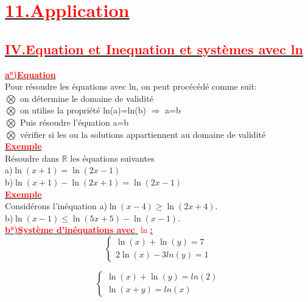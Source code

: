 \documentclass[12pt]{article}
\begin{document}
\section*{\underline{\textbf{\textcolor{red}{11.Application}}}}
\subsection*{\underline{\textbf{\textcolor{red}{IV.Equation et Inequation et systèmes avec ln}}}}
\underline{\textbf{\textcolor{red}{a°)Equation}}}\\
Pour résoudre les équations avec ln, on peut procécédé comme suit:\\
$\bigotimes$ on détermine le domaine de validité\\
$\bigotimes$ on utilise la propriété ln(a)=ln(b) $\Longrightarrow$ a=b \\
$\bigotimes$ Puis résoudre l'équation a=b\\
$\bigotimes$ vérifier si les ou la solutions appartiennent au domaine de validité\\
\underline{\textbf{\textcolor{red}{Exemple}}}\\
Résoudre dans $\mathbb{R}$ les équations suivantes\\
a)$\ln(x+1)=\ln(2x-1)$\\
b)$\ln(x+1)-\ln(2x+1)=\ln(2x-1)$\\
\underline{\textbf{\textcolor{red}{Exemple}}}\\
Considérons l'inéquation 
a)$\ln(x-4)\geq \ln(2x+4).$\\
b)$\ln(x-1)\leq \ln(5x+5)-\ln(x-1).$\\
\underline{\textbf{\textcolor{red}{b°)Système d'inéquations avec $\ln$:}}}\\
\[
\begin{cases}
\ln(x)+\ln(y) = 7 \\
2\ln(x)-3ln(y) = 1
\end{cases}
\]

\[
\begin{cases}
\ln(x)+\ln(y) = ln(2) \\
\ln(x+y) = ln(x)
\end{cases}
\]
\end{document}

